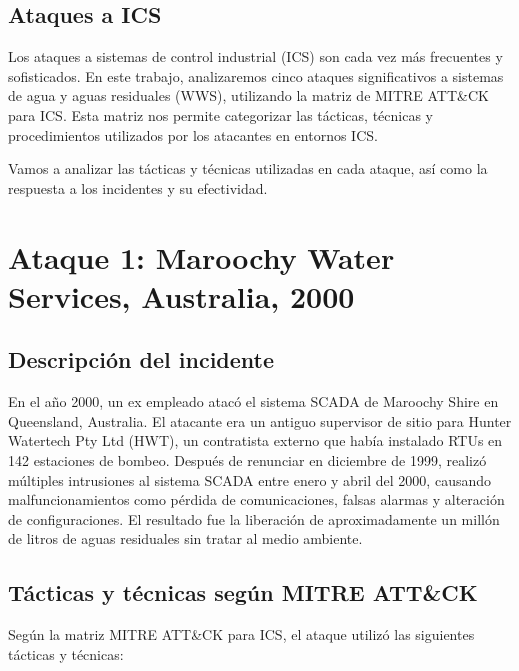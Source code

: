 \subsection{Ataques a ICS}
Los ataques a sistemas de control industrial (ICS) son cada vez más frecuentes y sofisticados. En este trabajo, analizaremos cinco ataques significativos a sistemas de agua y aguas residuales (WWS), utilizando la matriz de MITRE ATT\&CK para ICS. Esta matriz nos permite categorizar las tácticas, técnicas y procedimientos utilizados por los atacantes en entornos ICS.

Vamos a analizar las tácticas y técnicas utilizadas en cada ataque, así como la respuesta a los incidentes y su efectividad.
\newpage
\section{Ataque 1: Maroochy Water Services, Australia, 2000}

\subsection{Descripción del incidente}
En el año 2000, un ex empleado atacó el sistema SCADA de Maroochy Shire en Queensland, Australia. El atacante era un antiguo supervisor de sitio para Hunter Watertech Pty Ltd (HWT), un contratista externo que había instalado RTUs en 142 estaciones de bombeo. Después de renunciar en diciembre de 1999, realizó múltiples intrusiones al sistema SCADA entre enero y abril del 2000, causando malfuncionamientos como pérdida de comunicaciones, falsas alarmas y alteración de configuraciones. El resultado fue la liberación de aproximadamente un millón de litros de aguas residuales sin tratar al medio ambiente.
\nl

\nl

\subsection{Tácticas y técnicas según MITRE ATT\&CK}
Según la matriz MITRE ATT\&CK para ICS, el ataque utilizó las siguientes tácticas y técnicas:

